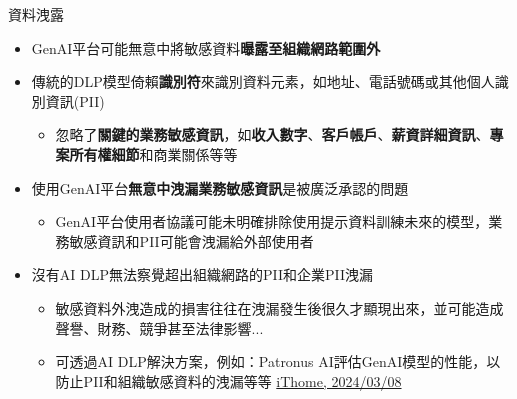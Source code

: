 \documentclass[aspectratio=1610]{Common/MyCourseBeamer}
\begin{document}
\begin{frame}[allowframebreaks]{資料洩露}
	
	\begin{itemize}
		\item GenAI平台可能無意中將敏感資料\textbf{曝露至組織網路範圍外}
		
		
		\item 傳統的DLP模型倚賴\textbf{識別符}來識別資料元素，如地址、電話號碼或其他個人識別資訊(PII)
		\begin{itemize}
			\item 忽略了\textbf{關鍵的業務敏感資訊}，如\textbf{收入數字}、\textbf{客戶帳戶}、\textbf{薪資詳細資訊}、\textbf{專案所有權細節}和商業關係等等
		\end{itemize}
		
		\item 使用GenAI平台\textbf{無意中洩漏業務敏感資訊}是被廣泛承認的問題
		\begin{itemize}
			\item GenAI平台使用者協議可能未明確排除使用提示資料訓練未來的模型，業務敏感資訊和PII可能會洩漏給外部使用者
		\end{itemize}
		
		\item 沒有AI DLP無法察覺超出組織網路的PII和企業PII洩漏
		\begin{itemize}
			\item 敏感資料外洩造成的損害往往在洩漏發生後很久才顯現出來，並可能造成聲譽、財務、競爭甚至法律影響...
			
			\item 可透過AI DLP解決方案，例如：Patronus AI評估GenAI模型的性能，以防止PII和組織敏感資料的洩漏等等 \href{https://www.ithome.com.tw/news/161674}{iThome, 2024/03/08}
		\end{itemize}
		
		
	\end{itemize}
	
\end{frame}
\end{document}
